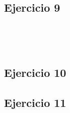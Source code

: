 \documentclass[10pt,a4paper]{article}
\begin{document}
\subsubsection{}
    \begin{lstlisting}
    \end{lstlisting}
\subsubsection{}
    \begin{lstlisting}
    \end{lstlisting}
\subsection{Ejercicio 9}
\subsubsection{}
    \begin{lstlisting}
    \end{lstlisting}
\subsubsection{}
    \begin{lstlisting}
    \end{lstlisting}
\subsubsection{}
    \begin{lstlisting}
    \end{lstlisting}
\subsection{Ejercicio 10}
\subsection{Ejercicio 11}
\subsubsection{}
    \begin{lstlisting}
    \end{lstlisting}
\subsubsection{}
    \begin{lstlisting}
    \end{lstlisting}
\end{document}
